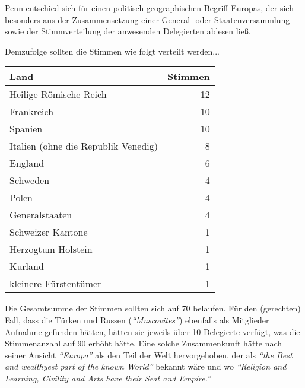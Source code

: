 \medskip

Penn entschied sich für einen politisch-geographischen Begriff Europas, der sich
besonders aus der Zusammensetzung einer General- oder Staatenversammlung sowie
der Stimmverteilung der anwesenden Delegierten ablesen ließ.

Demzufolge sollten die Stimmen wie folgt verteilt werden...

\begin{center}
\begin{tabular}{|l|r|} \hline
\textbf{Land }                      & \textbf{Stimmen} \\ \hline \hline
Heilige Römische Reich              & 12               \\ \hline
Frankreich                          & 10               \\ \hline
Spanien                             & 10               \\ \hline
Italien (ohne die Republik Venedig) & 8                \\ \hline
England                             & 6                \\ \hline
Schweden                            & 4                \\ \hline
Polen                               & 4                \\ \hline
Generalstaaten                      & 4                \\ \hline
Schweizer Kantone                   & 1                \\ \hline
Herzogtum Holstein                  & 1                \\ \hline
Kurland                             & 1                \\ \hline
kleinere Fürstentümer               & 1                \\ \hline
\end{tabular}
\end{center}

           
Die Gesamtsumme der Stimmen sollten sich auf 70 belaufen. Für den (gerechten) Fall, dass die Türken und Russen
(\textit{"`Muscovites"'}) ebenfalls als Mitglieder Aufnahme gefunden hätten, hätten sie jeweils über 10 Delegierte verfügt, was die Stimmenanzahl auf 90 erhöht hätte.
Eine solche Zusammenkunft hätte nach seiner Ansicht \textit{"`Europa"'} als den Teil der
Welt hervorgehoben, der als \textit{"`the Best and wealthyest part of the known
World"'} bekannt wäre und wo \textit{"`Religion and Learning, Civility and Arts have
their Seat and Empire."'}

